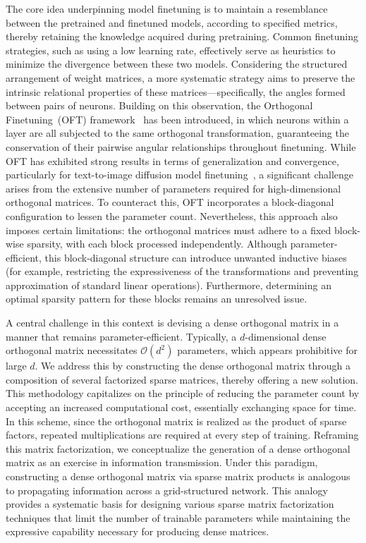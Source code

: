 The core idea underpinning model finetuning is to maintain a resemblance between the pretrained and finetuned models, according to specified metrics, thereby retaining the knowledge acquired during pretraining. Common finetuning strategies, such as using a low learning rate, effectively serve as heuristics to minimize the divergence between these two models. Considering the structured arrangement of weight matrices, a more systematic strategy aims to preserve the intrinsic relational properties of these matrices—specifically, the angles formed between pairs of neurons. Building on this observation, the Orthogonal Finetuning~(OFT) framework~\cite{qiu2023controlling} has been introduced, in which neurons within a layer are all subjected to the same orthogonal transformation, guaranteeing the conservation of their pairwise angular relationships throughout finetuning. While OFT has exhibited strong results in terms of generalization and convergence, particularly for text-to-image diffusion model finetuning~\cite{qiu2023controlling}, a significant challenge arises from the extensive number of parameters required for high-dimensional orthogonal matrices. To counteract this, OFT incorporates a block-diagonal configuration to lessen the parameter count. Nevertheless, this approach also imposes certain limitations: the orthogonal matrices must adhere to a fixed block-wise sparsity, with each block processed independently. Although parameter-efficient, this block-diagonal structure can introduce unwanted inductive biases (for example, restricting the expressiveness of the transformations and preventing approximation of standard linear operations). Furthermore, determining an optimal sparsity pattern for these blocks remains an unresolved issue.

A central challenge in this context is devising a dense orthogonal matrix in a manner that remains parameter-efficient. Typically, a $d$-dimensional dense orthogonal matrix necessitates $\mathcal{O}(d^2)$ parameters, which appears prohibitive for large $d$. We address this by constructing the dense orthogonal matrix through a composition of several factorized sparse matrices, thereby offering a new solution. This methodology capitalizes on the principle of reducing the parameter count by accepting an increased computational cost, essentially exchanging space for time. In this scheme, since the orthogonal matrix is realized as the product of sparse factors, repeated multiplications are required at every step of training. Reframing this matrix factorization, we conceptualize the generation of a dense orthogonal matrix as an exercise in information transmission. Under this paradigm, constructing a dense orthogonal matrix via sparse matrix products is analogous to propagating information across a grid-structured network. This analogy provides a systematic basis for designing various sparse matrix factorization techniques that limit the number of trainable parameters while maintaining the expressive capability necessary for producing dense matrices.

